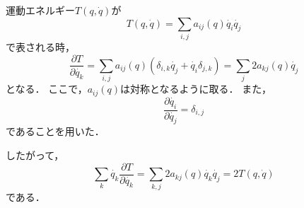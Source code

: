 \documentclass[12pt]{article}
\begin{document}
	運動エネルギー$T(q, \dot{q})$が
	\[
	T(q, \dot{q}) = \sum_{i,j} a_{ij}(q) \dot{q_i} \dot{q_j}
	\]
	で表される時，
	\[
	\frac{\partial T}{\partial \dot{q_k}}
	= \sum_{i,j} a_{ij}(q) \left( \delta_{i,k} \dot{q_j} + \dot{q_i} \delta_{j,k} \right)
	=\sum_j 2a_{kj}(q) \dot{q_j}
	\]
	となる．
	ここで，$a_{ij}(q)$は対称となるように取る．
	また，
	\[
	\frac{\partial \dot{q_i}}{\partial \dot{q_j}} = \delta_{i,j}
	\]
	であることを用いた．
	
	したがって，
	\[
	\sum_{k} \dot{q_k} \frac{\partial T}{\partial \dot{q_k}}
	=\sum_{k,j} 2a_{kj}(q) \dot{q_k} \dot{q_j}
	=2T(q, \dot{q})
	\]
	である．
\end{document}
